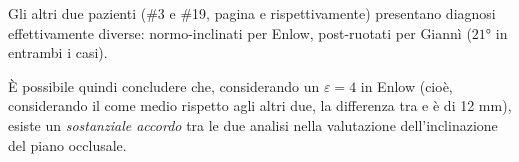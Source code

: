 Gli altri due pazienti (\#3 e \#19, pagina \pageref{paz:MASCHI2000} e \pageref{paz:ELITRI1998} rispettivamente) presentano diagnosi effettivamente diverse: normo-inclinati per Enlow, post-ruotati per Giannì ($21°$ in entrambi i casi).

È possibile quindi concludere che, considerando un $\varepsilon = 4$ in Enlow (cioè, considerando il  come medio rispetto agli altri due, la differenza tra  e  è di 12 mm), esiste un \emph{sostanziale accordo} tra le due analisi nella valutazione dell'inclinazione del piano occlusale.